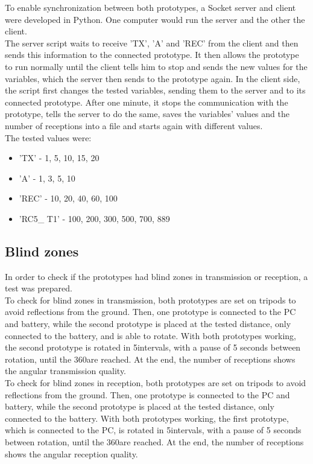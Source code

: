 To enable synchronization between both prototypes, a Socket server and client were developed in Python. One computer would run the server and the other the client.\\
The server script waits to receive 'TX', 'A' and 'REC' from the client and then sends this information to the connected prototype. It then allows the prototype to run normally until the client tells him to stop and sends the new values for the variables, which the server then sends to the prototype again. In the client side, the script first changes the tested variables, sending them to the server and to its connected prototype. After one minute, it stops the communication with the prototype, tells the server to do the same, saves the variables' values and the number of receptions into a file and starts again with different values.\\

The tested values were:
\begin{itemize}
\item 'TX' - 1, 5, 10, 15, 20
\item 'A' - 1, 3, 5, 10
\item 'REC' - 10, 20, 40, 60, 100
\item 'RC5\_ T1' - 100, 200, 300, 500, 700, 889
\end{itemize}

\subsection{Blind zones}
\label{subsection:blindzones}
In order to check if the prototypes had blind zones in transmission or reception, a test was prepared.\\
To check for blind zones in transmission, both prototypes are set on tripods to avoid reflections from the ground. Then, one prototype is connected to the PC and battery, while the second prototype is placed at the tested distance, only connected to the battery, and is able to rotate. With both prototypes working, the second prototype is rotated in 5\degree intervals, with a pause of 5 seconds between rotation, until the 360\degree are reached. At the end, the number of receptions shows the angular transmission quality.\\

To check for blind zones in reception, both prototypes are set on tripods to avoid reflections from the ground. Then, one prototype is connected to the PC and battery, while the second prototype is placed at the tested distance, only connected to the battery. With both prototypes working, the first prototype, which is connected to the PC, is rotated in 5\degree intervals, with a pause of 5 seconds between rotation, until the 360\degree are reached. At the end, the number of receptions shows the angular reception quality.\\

